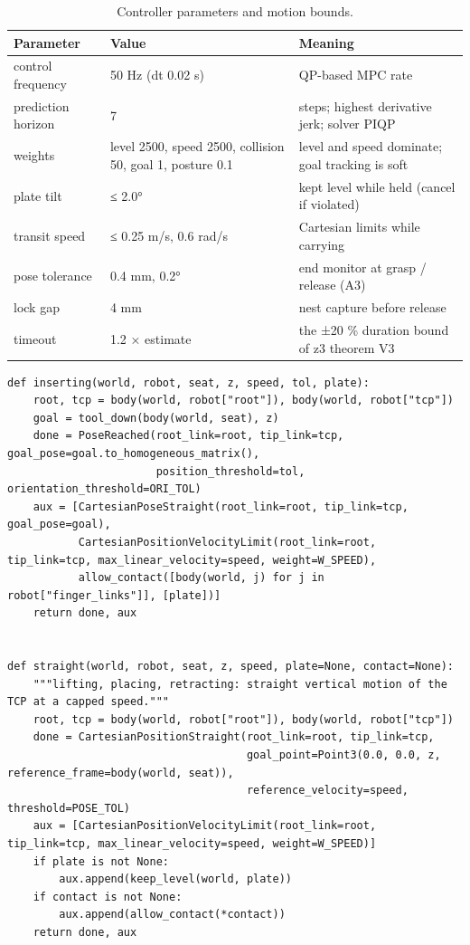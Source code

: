 \documentclass[10pt,a4paper]{article}
\begin{document}
\begin{table}[tbp]\centering\small
\caption{Controller parameters and motion bounds.}\label{tab:giskard}
\begin{tabularx}{\linewidth}{p{2.6cm}XX}\toprule
\textbf{Parameter} & \textbf{Value} & \textbf{Meaning} \\\midrule
control frequency & 50 Hz (dt 0.02 s) & QP-based MPC rate \\
prediction horizon & 7 & steps; highest derivative jerk; solver PIQP \\
weights & level 2500, speed 2500, collision 50, goal 1, posture 0.1 & level and speed dominate; goal tracking is soft \\
plate tilt & ≤ 2.0° & kept level while held (cancel if violated) \\
transit speed & ≤ 0.25 m/s, 0.6 rad/s & Cartesian limits while carrying \\
pose tolerance & 0.4 mm, 0.2° & end monitor at grasp / release (A3) \\
lock gap & 4 mm & nest capture before release \\
timeout & 1.2 × estimate & the ±20 \% duration bound of z3 theorem V3 \\\bottomrule
\end{tabularx}
\end{table}

\begin{listing}[tbp]
\begin{Verbatim}[fontsize=\footnotesize,breaklines,frame=lines,framesep=2mm]
def inserting(world, robot, seat, z, speed, tol, plate):
    root, tcp = body(world, robot["root"]), body(world, robot["tcp"])
    goal = tool_down(body(world, seat), z)
    done = PoseReached(root_link=root, tip_link=tcp, goal_pose=goal.to_homogeneous_matrix(),
                       position_threshold=tol, orientation_threshold=ORI_TOL)
    aux = [CartesianPoseStraight(root_link=root, tip_link=tcp, goal_pose=goal),
           CartesianPositionVelocityLimit(root_link=root, tip_link=tcp, max_linear_velocity=speed, weight=W_SPEED),
           allow_contact([body(world, j) for j in robot["finger_links"]], [plate])]
    return done, aux


def straight(world, robot, seat, z, speed, plate=None, contact=None):
    """lifting, placing, retracting: straight vertical motion of the TCP at a capped speed."""
    root, tcp = body(world, robot["root"]), body(world, robot["tcp"])
    done = CartesianPositionStraight(root_link=root, tip_link=tcp,
                                     goal_point=Point3(0.0, 0.0, z, reference_frame=body(world, seat)),
                                     reference_velocity=speed, threshold=POSE_TOL)
    aux = [CartesianPositionVelocityLimit(root_link=root, tip_link=tcp, max_linear_velocity=speed, weight=W_SPEED)]
    if plate is not None:
        aux.append(keep_level(world, plate))
    if contact is not None:
        aux.append(allow_contact(*contact))
    return done, aux
\end{Verbatim}
\caption{The generated giskardpy statechart for inserting into a seat.}\label{lst:giskard}
\end{listing}
\end{document}
